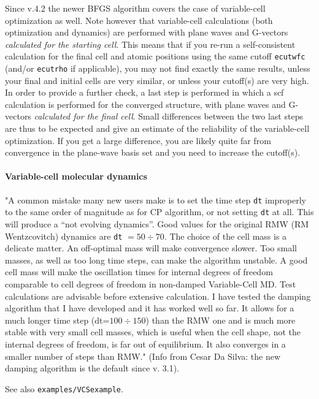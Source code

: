 \documentclass[12pt,a4paper]{article}
\begin{document}
Since v.4.2 the newer BFGS algorithm covers the case of variable-cell
optimization as well. Note however that variable-cell calculations
(both optimization and dynamics) are performed with plane waves and 
G-vectors {\em calculated for the starting cell}. This means that if 
you re-run a self-consistent calculation for the final cell and atomic 
positions using the same cutoff \texttt{ecutwfc} (and/or \texttt{ecutrho} 
if applicable), you may not find exactly the same results, unless your
final and initial cells are very similar, or unless your cutoff(s) are very
high. In order to provide a further check, a last step is performed in
which a scf calculation is performed for the converged structure, with
plane waves and G-vectors {\em calculated for the final cell}. Small 
differences between the two last steps are thus to be expected and give
an estimate of the reliability of the variable-cell optimization.
If you get a large difference, you are likely quite far from convergence
in the plane-wave basis set and you need to increase the cutoff(s).

\paragraph{Variable-cell molecular dynamics}

"A common mistake many new users make is to set the time step \texttt{dt}
improperly to the same order of magnitude as for CP algorithm, or
not setting \texttt{dt} at all. This will produce a ``not evolving dynamics''.
Good values for the original RMW (RM Wentzcovitch) dynamics are 
\texttt{dt} $ = 50 \div 70$. The choice of the cell mass is a delicate matter. An
off-optimal mass will make convergence slower. Too small masses, as
well as too long time steps, can make the algorithm unstable. A good
cell mass will make the oscillation times for internal degrees of
freedom comparable to cell degrees of freedom in non-damped
Variable-Cell MD. Test calculations are advisable before extensive
calculation. I have tested the damping algorithm that I have developed
and it has worked well so far. It allows for a much longer time step
(dt=$100 \div 150$) than the RMW one and is much more stable with very
small cell masses, which is useful when the cell shape, not the
internal degrees of freedom, is far out of equilibrium. It also
converges in a smaller number of steps than RMW." (Info from Cesar Da
Silva: the new damping algorithm is the default since v. 3.1).

See also \texttt{examples/VCSexample}.
\end{document}
